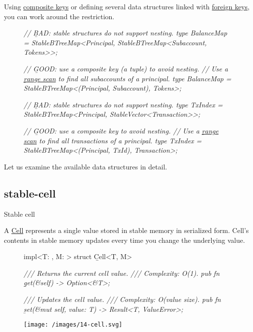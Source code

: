 \documentclass{article}
\begin{document}
Using \href{https://en.wikipedia.org/wiki/Composite_key}{composite keys} or defining several data structures linked with \href{https://en.wikipedia.org/wiki/Foreign_key}{foreign keys}, you can work around the restriction.

\begin{figure}
\begin{code}[bad]
\em{// \b{BAD}: stable structures do not support nesting.}
type BalanceMap = StableBTreeMap<Principal, StableBTreeMap<Subaccount, Tokens>>;
\end{code}
\begin{code}[good]
\em{// \b{GOOD}: use a composite key (a tuple) to avoid nesting.}
\em{// Use a \href{#range-scan-example}{\b{range scan}} to find all subaccounts of a principal.}
type BalanceMap = StableBTreeMap<(Principal, Subaccount), Tokens>;
\end{code}
\begin{code}[bad]
\em{// \b{BAD}: stable structures do not support nesting.}
type TxIndex = StableBTreeMap<Principal, StableVector<Transaction>>;
\end{code}
\begin{code}[good]
\em{// \b{GOOD}: use a composite key to avoid nesting.}
\em{// Use a \href{#range-scan-example}{\b{range scan}} to find all transactions of a principal.}
type TxIndex = StableBTreeMap<(Principal, TxId), Transaction>;
\end{code}
\end{figure}

Let us examine the available data structures in detail.

\subsection{stable-cell}{Stable cell}

A \href{https://docs.rs/ic-stable-structures/latest/ic_stable_structures/cell/struct.Cell.html}{Cell} represents a single value stored in stable memory in serialized form.
Cell's contents in stable memory updates every time you change the underlying value.

\begin{figure}
\begin{code}[rust]
impl<T: \href{#storable-trait}{}, M: \href{#memory}{}> struct \b{Cell}<T, M> {
    \em{/// Returns the current cell value.}
    \em{/// Complexity: O(1).}
    pub fn \b{get}(&self) -> Option<&T>;

    \em{/// Updates the cell value.}
    \em{/// Complexity: O(value size).}
    pub fn \b{set}(&mut self, value: T) -> Result<T, ValueError>;
}
\end{code}
\end{figure}
\begin{figure}[grayscale-diagram]
  \texttt{[image: /images/14-cell.svg]}
\end{figure}
\end{document}
